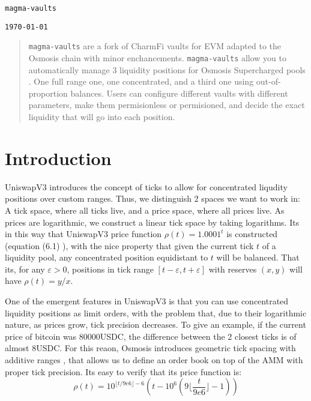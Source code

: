 \documentclass[11pt]{article}
\begin{document}
\begin{center}
\texttt{\Large magma-vaults}

\vspace{0.5em} %
\texttt{\large \today}
\end{center}

\begin{abstract}
    \texttt{magma-vaults} are a fork of CharmFi vaults for EVM
    \cite{charmfi-doc} adapted to the Osmosis chain with minor enchancements.
    \texttt{magma-vaults} allow you to automatically manage 3 liquidity
    positions for Osmosis Supercharged pools \cite{osmosis-supercharged-doc}.
    One full range one, one concentrated, and a third one using
    out-of-proportion balances. Users can configure different vaults with
    different parameters, make them permisionless or permisioned, and decide
    the exact liquidity that will go into each position.
\end{abstract}

\section{Introduction}
UniswapV3 introduces the concept of ticks to allow for concentrated liqudity
positions over custom ranges. Thus, we distinguish 2 spaces we want to work in:
A tick space, where all ticks live, and a price space, where all prices live. As
prices are logarithmic, we construct a linear tick space by taking logarithms.
Its in this way that UniswapV3 price function $\rho(t) = 1.0001^t$ is constructed
(equation (6.1) \citep{uniswapv3}), with the nice property that given the current
tick $t$ of a liquidity pool, any concentrated position equidistant to $t$ will
be balanced. That its, for any $\varepsilon > 0$, positions in tick range
$[t-\varepsilon, t + \varepsilon]$ with reserves $(x, y)$ will have $\rho(t) =
y/x$.

One of the emergent features in UniswapV3 is that you can use concentrated
liquidity positions as limit orders, with the problem that, due to their
logarithmic nature, as prices grow, tick precision decreases. To give
an example, if the current price of bitcoin was 80000USDC, the difference
between the 2 closest ticks is of almost 8USDC. For this reaon, Osmosis introduces
geometric tick spacing with additive ranges \cite{osmosis-price-function}, that
allows us to define an order book on top of the AMM with proper tick precision.
Its easy to verify that its price function is:
\[
\rho(t) = 10^{\lfloor t/9e6\rfloor - 6} \left(
    t - 10^6\left(9\lfloor\frac{t}{9e6}\rfloor - 1\right)
\right)
\]
\end{document}
